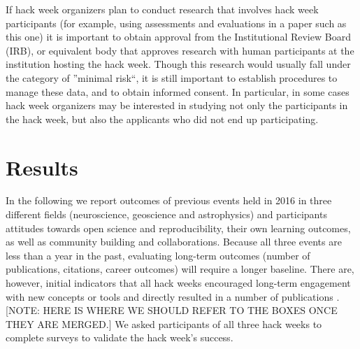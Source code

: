If hack week organizers plan to conduct research that involves hack week participants (for example, using assessments and evaluations in a paper such as this one) it is important to obtain approval from the Institutional Review Board (IRB), or equivalent body that approves research with human participants at the institution hosting the hack week.
Though this research would usually fall under the category of ''minimal risk``, it is still important to establish procedures to manage these data, and to obtain informed consent.
In particular, in some cases hack week organizers may be interested in studying not only the participants in the hack week, but also the applicants who did not end up participating.

\section*{Results}

In the following we report outcomes of previous events held in 2016 in three different fields (neuroscience, geoscience and astrophysics) and participants attitudes towards open science and reproducibility, their own learning outcomes, as well as community building and collaborations.
Because all three events are less than a year in the past, evaluating long-term outcomes (number of publications, citations, career outcomes) will require a longer baseline.
There are, however, initial indicators that all hack weeks encouraged long-term engagement with new concepts or tools and directly resulted in a number of publications \citep{gullysantiago2015,faria2016,keshavan2017,leonard2017,jordan2017,peterson2017,hahn2017,pricewhelan2017}.
[NOTE: HERE IS WHERE WE SHOULD REFER TO THE BOXES ONCE THEY ARE MERGED.]
We asked participants of all three hack weeks to complete surveys to validate the hack week's success.

